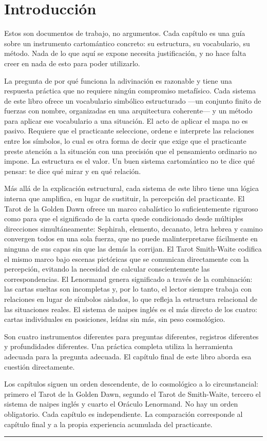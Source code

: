 \section{Introducción}\label{introduction}

Estos son documentos de trabajo, no argumentos. Cada capítulo es una guía sobre un instrumento cartomántico concreto: su estructura, su vocabulario, su método. Nada de lo que aquí se expone necesita justificación, y no hace falta creer en nada de esto para poder utilizarlo.

La pregunta de por qué funciona la adivinación es razonable y tiene una respuesta práctica que no requiere ningún compromiso metafísico. Cada sistema de este libro ofrece un vocabulario simbólico estructurado ---un conjunto finito de fuerzas con nombre, organizadas en una arquitectura coherente--- y un método para aplicar ese vocabulario a una situación. El acto de aplicar el mapa no es pasivo. Requiere que el practicante seleccione, ordene e interprete las relaciones entre los símbolos, lo cual es otra forma de decir que exige que el practicante preste atención a la situación con una precisión que el pensamiento ordinario no impone. La estructura es el valor. Un buen sistema cartomántico no te dice qué pensar: te dice qué mirar y en qué relación.

Más allá de la explicación estructural, cada sistema de este libro tiene una lógica interna que amplifica, en lugar de sustituir, la percepción del practicante. El Tarot de la Golden Dawn ofrece un marco cabalístico lo suficientemente riguroso como para que el significado de la carta quede condicionado desde múltiples direcciones simultáneamente: Sephirah, elemento, decanato, letra hebrea y camino convergen todos en una sola fuerza, que no puede malinterpretarse fácilmente en ninguna de sus capas sin que las demás la corrijan. El Tarot Smith-Waite codifica el mismo marco bajo escenas pictóricas que se comunican directamente con la percepción, evitando la necesidad de calcular conscientemente las correspondencias. El Lenormand genera significado a través de la combinación: las cartas sueltas son incompletas y, por lo tanto, el lector siempre trabaja con relaciones en lugar de símbolos aislados, lo que refleja la estructura relacional de las situaciones reales. El sistema de naipes inglés es el más directo de los cuatro: cartas individuales en posiciones, leídas sin más, sin peso cosmológico.

Son cuatro instrumentos diferentes para preguntas diferentes, registros diferentes y profundidades diferentes. Una práctica completa utiliza la herramienta adecuada para la pregunta adecuada. El capítulo final de este libro aborda esa cuestión directamente.

Los capítulos siguen un orden descendente, de lo cosmológico a lo circunstancial: primero el Tarot de la Golden Dawn, segundo el Tarot de Smith-Waite, tercero el sistema de naipes inglés y cuarto el Oráculo Lenormand. No hay un orden obligatorio. Cada capítulo es independiente. La comparación corresponde al capítulo final y a la propia experiencia acumulada del practicante.

\begin{center}\rule{0.5\linewidth}{0.5pt}\end{center}
